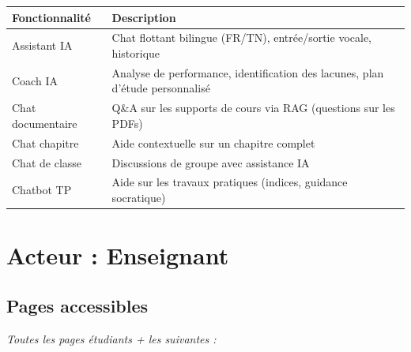 \documentclass[12pt,a4paper]{article}
\begin{document}
\begin{longtable}{@{}p{3.5cm}p{11cm}@{}}
\toprule
\textbf{Fonctionnalité} & \textbf{Description} \\
\midrule
\endhead
Assistant IA & Chat flottant bilingue (FR/TN), entrée/sortie vocale, historique \\
Coach IA & Analyse de performance, identification des lacunes, plan d'étude personnalisé \\
Chat documentaire & Q\&A sur les supports de cours via RAG (questions sur les PDFs) \\
Chat chapitre & Aide contextuelle sur un chapitre complet \\
Chat de classe & Discussions de groupe avec assistance IA \\
Chatbot TP & Aide sur les travaux pratiques (indices, guidance socratique) \\
\bottomrule
\end{longtable}

\section{Acteur : Enseignant}

\subsection{Pages accessibles}
\textit{Toutes les pages étudiants + les suivantes :}
\end{document}
